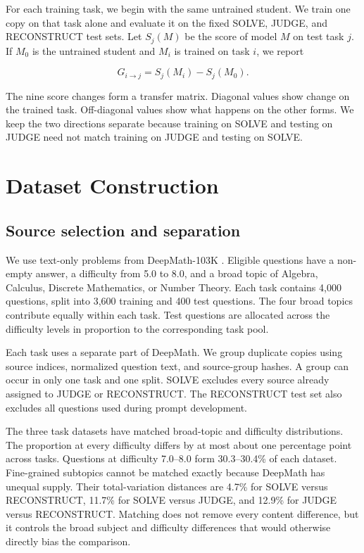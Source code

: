 \documentclass[11pt]{article}
\begin{document}
For each training task, we begin with the same untrained student. We train one copy on that task alone and evaluate it on the fixed SOLVE, JUDGE, and RECONSTRUCT test sets. Let $S_j(M)$ be the score of model $M$ on test task $j$. If $M_0$ is the untrained student and $M_i$ is trained on task $i$, we report

\begin{equation}
G_{i\rightarrow j}=S_j(M_i)-S_j(M_0).
\end{equation}

The nine score changes form a transfer matrix. Diagonal values show change on the trained task. Off-diagonal values show what happens on the other forms. We keep the two directions separate because training on SOLVE and testing on JUDGE need not match training on JUDGE and testing on SOLVE.

\section{Dataset Construction}

\subsection{Source selection and separation}

We use text-only problems from DeepMath-103K \citep{he2026deepmath}. Eligible questions have a non-empty answer, a difficulty from 5.0 to 8.0, and a broad topic of Algebra, Calculus, Discrete Mathematics, or Number Theory. Each task contains 4,000 questions, split into 3,600 training and 400 test questions. The four broad topics contribute equally within each task. Test questions are allocated across the difficulty levels in proportion to the corresponding task pool.

Each task uses a separate part of DeepMath. We group duplicate copies using source indices, normalized question text, and source-group hashes. A group can occur in only one task and one split. SOLVE excludes every source already assigned to JUDGE or RECONSTRUCT. The RECONSTRUCT test set also excludes all questions used during prompt development.

The three task datasets have matched broad-topic and difficulty distributions. The proportion at every difficulty differs by at most about one percentage point across tasks. Questions at difficulty 7.0--8.0 form 30.3--30.4\% of each dataset. Fine-grained subtopics cannot be matched exactly because DeepMath has unequal supply. Their total-variation distances are 4.7\% for SOLVE versus RECONSTRUCT, 11.7\% for SOLVE versus JUDGE, and 12.9\% for JUDGE versus RECONSTRUCT. Matching does not remove every content difference, but it controls the broad subject and difficulty differences that would otherwise directly bias the comparison.
\end{document}
